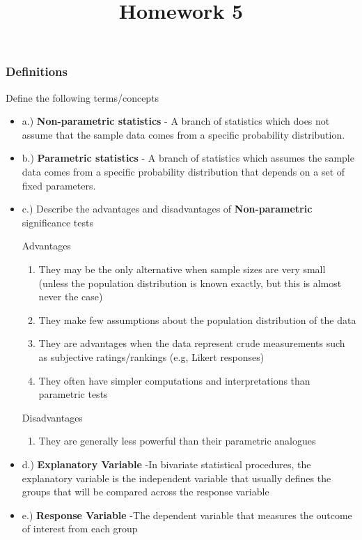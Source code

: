 \documentclass[
]{article}
\title{Homework 5}
\author{}
\date{\vspace{-2.5em}}
\providecommand{\tightlist}{%
  \setlength{\itemsep}{0pt}\setlength{\parskip}{0pt}}
\begin{document}
\maketitle

\subsubsection{Definitions}\label{definitions}

Define the following terms/concepts

\begin{itemize}
\item
  a.) \textbf{Non-parametric statistics} {- A branch of statistics which
  does not assume that the sample data comes from a specific probability
  distribution. }
\item
  b.) \textbf{Parametric statistics} {- A branch of statistics which
  assumes the sample data comes from a specific probability distribution
  that depends on a set of fixed parameters.}
\item
  c.) Describe the advantages and disadvantages of
  \textbf{Non-parametric} significance tests

  Advantages

  \begin{enumerate}
  \def\labelenumi{\arabic{enumi}.}
  \item
    {They may be the only alternative when sample sizes are very small
    (unless the population distribution is known exactly, but this is
    almost never the case)}
  \item
    {They make few assumptions about the population distribution of the
    data}
  \item
    {They are advantages when the data represent crude measurements such
    as subjective ratings/rankings (e.g, Likert responses)}
  \item
    {They often have simpler computations and interpretations than
    parametric tests}
  \end{enumerate}

  Disadvantages

  \begin{enumerate}
  \def\labelenumi{\arabic{enumi}.}
  \tightlist
  \item
    {They are generally less powerful than their parametric analogues}
  \end{enumerate}
\end{itemize}

\begin{itemize}
\item
  d.) \textbf{Explanatory Variable} {-In bivariate statistical
  procedures, the explanatory variable is the independent variable that
  usually defines the groups that will be compared across the response
  variable}
\item
  e.) \textbf{Response Variable} {-The dependent variable that measures
  the outcome of interest from each group}
\end{itemize}
\end{document}
